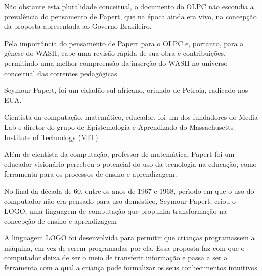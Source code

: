 \documentclass[
12pt,		%
openright,	%
twoside,  %
a4paper,			%
chapter=TITLE,		%
english,			%
french,				%
spanish,			%
brazil				%
]{USPSC-classe/USPSC_RedarTex}
\begin{document}
N\~ao obstante esta pluralidade conceitual, o documento do OLPC n\~ao escondia a preval\^encia do pensamento de Papert, que na \'epoca ainda era vivo, na concep\c{c}\~ao da proposta apresentada ao Governo Brasileiro.








Pela import\^ancia do pensamento de Papert para o OLPC e, portanto, para a g\^enese do WASH, cabe uma revis\~ao r\'apida de sua obra e contribui\c{c}\~oes, permitindo uma melhor compreens\~ao da inser\c{c}\~ao do WASH no universo conceitual das correntes pedag\'ogicas.








Seymour Papert, foi um cidad\~ao sul-africano, oriundo de Petroia, radicado nos EUA.








Cientista da computa\c{c}\~ao, matem\'atico, educador, foi um dos fundadores do Media Lab e diretor do grupo de Epistemologia e Aprendizado do Massachusetts Institute of Technology (MIT)








Al\'em de cientista da computa\c{c}\~ao, professor de matem\'atica, Papert foi um educador vision\'ario percebeu o potencial do uso da tecnologia na educa\c{c}\~ao, como ferramenta para os processos de  ensino e aprendizagem.








No final da d\'ecada de 60, entre os anos de 1967 e 1968, per\'{\i}odo em que o uso do computador n\~ao era pensado para uso dom\'estico, Seymour Papert, criou o LOGO, uma linguagem de computa\c{c}\~ao que propunha transforma\c{c}\~ao  na concep\c{c}\~ao de ensino e aprendizagem








A linguagem LOGO  foi desenvolvida para permitir que crian\c{c}as programassem a m\'aquina, em vez de serem programadas por ela. Essa proposta faz com que o computador deixa de ser o meio de transferir informa\c{c}\~ao e passa a ser a ferramenta com a qual a crian\c{c}a pode formalizar os seus conhecimentos intuitivos
\end{document}
